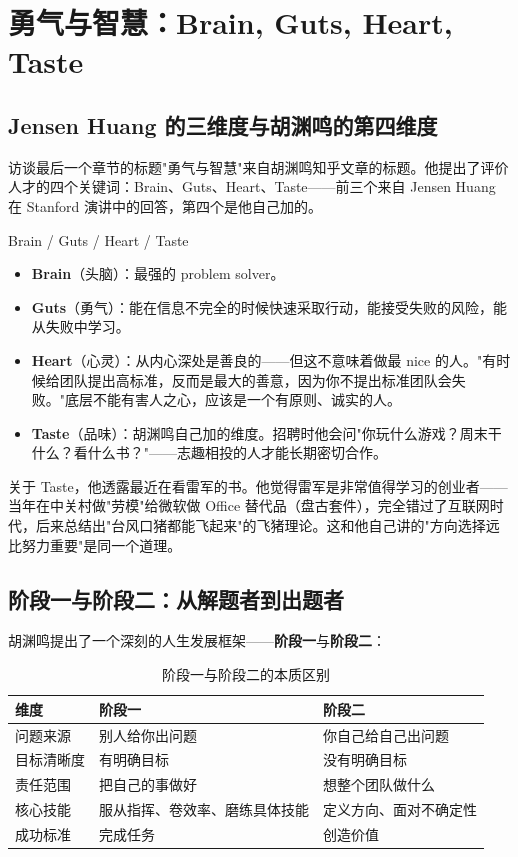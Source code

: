 \section{勇气与智慧：Brain, Guts, Heart, Taste}

\subsection{Jensen Huang 的三维度与胡渊鸣的第四维度}

访谈最后一个章节的标题"勇气与智慧"来自胡渊鸣知乎文章的标题。他提出了评价人才的四个关键词：Brain、Guts、Heart、Taste——前三个来自 Jensen Huang 在 Stanford 演讲中的回答，第四个是他自己加的。

\begin{importantbox}{{Brain / Guts / Heart / Taste}}
\begin{itemize}
\item \textbf{Brain}（头脑）：最强的 problem solver。
\item \textbf{Guts}（勇气）：能在信息不完全的时候快速采取行动，能接受失败的风险，能从失败中学习。
\item \textbf{Heart}（心灵）：从内心深处是善良的——但这不意味着做最 nice 的人。"有时候给团队提出高标准，反而是最大的善意，因为你不提出标准团队会失败。"底层不能有害人之心，应该是一个有原则、诚实的人。
\item \textbf{Taste}（品味）：胡渊鸣自己加的维度。招聘时他会问"你玩什么游戏？周末干什么？看什么书？"——志趣相投的人才能长期密切合作。
\end{itemize}
\end{importantbox}

关于 Taste，他透露最近在看雷军的书。他觉得雷军是非常值得学习的创业者——当年在中关村做"劳模"给微软做 Office 替代品（盘古套件），完全错过了互联网时代，后来总结出"台风口猪都能飞起来"的飞猪理论。这和他自己讲的"方向选择远比努力重要"是同一个道理。

\subsection{阶段一与阶段二：从解题者到出题者}

胡渊鸣提出了一个深刻的人生发展框架——\textbf{阶段一}与\textbf{阶段二}：

\begin{table}[H]
\centering
\caption{阶段一与阶段二的本质区别}
\begin{tabular}{lll}
\toprule
\textbf{维度} & \textbf{阶段一} & \textbf{阶段二} \\
\midrule
问题来源 & 别人给你出问题 & 你自己给自己出问题 \\
目标清晰度 & 有明确目标 & 没有明确目标 \\
责任范围 & 把自己的事做好 & 想整个团队做什么 \\
核心技能 & 服从指挥、卷效率、磨练具体技能 & 定义方向、面对不确定性 \\
成功标准 & 完成任务 & 创造价值 \\
\bottomrule
\end{tabular}
\end{table}

